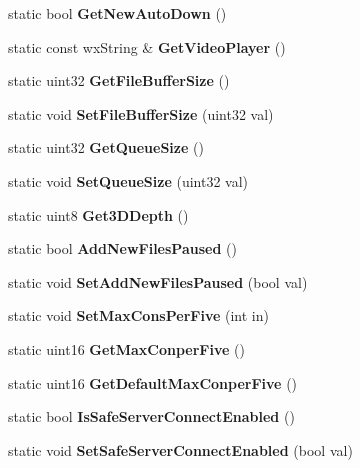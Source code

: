 \begin{DoxyCompactItemize}
\item 
static bool {\bfseries GetNewAutoDown} ()\label{classCPreferences_af483029d79a1d673b63ba3847f559cd7}

\item 
static const wxString \& {\bfseries GetVideoPlayer} ()\label{classCPreferences_a9b82041d9a7ebda1e9b80a2b0e37fae0}

\item 
static uint32 {\bfseries GetFileBufferSize} ()\label{classCPreferences_a3e0cb4b837ea40d72408ab0c2e45dd61}

\item 
static void {\bfseries SetFileBufferSize} (uint32 val)\label{classCPreferences_adc8cd56a2a10b67c694f39fccc25fcdd}

\item 
static uint32 {\bfseries GetQueueSize} ()\label{classCPreferences_a365188bc431fbd55e89ee4c84a73b2d3}

\item 
static void {\bfseries SetQueueSize} (uint32 val)\label{classCPreferences_af4591452705cc3fc1bfabe1d5db52a2f}

\item 
static uint8 {\bfseries Get3DDepth} ()\label{classCPreferences_af3706780341c2d58bbee54bd02c76323}

\item 
static bool {\bfseries AddNewFilesPaused} ()\label{classCPreferences_aa1aeea48735a2799045c25e0a3a3be7b}

\item 
static void {\bfseries SetAddNewFilesPaused} (bool val)\label{classCPreferences_a9e3bf45ca8798cbdbf07c69ac9e16ce4}

\item 
static void {\bfseries SetMaxConsPerFive} (int in)\label{classCPreferences_a0c23c86f7a02d384041899dd0035ceb4}

\item 
static uint16 {\bfseries GetMaxConperFive} ()\label{classCPreferences_af84b2c94aa6891c2b546b3fb5bad294b}

\item 
static uint16 {\bfseries GetDefaultMaxConperFive} ()\label{classCPreferences_a23508a3ca2b23f56ac676a2c4419e51d}

\item 
static bool {\bfseries IsSafeServerConnectEnabled} ()\label{classCPreferences_ad3d1503088a632a1a5cdc1d398be978f}

\item 
static void {\bfseries SetSafeServerConnectEnabled} (bool val)\label{classCPreferences_a5ca4abc26dcea201044bb82e036a9727}


\end{DoxyCompactItemize}
